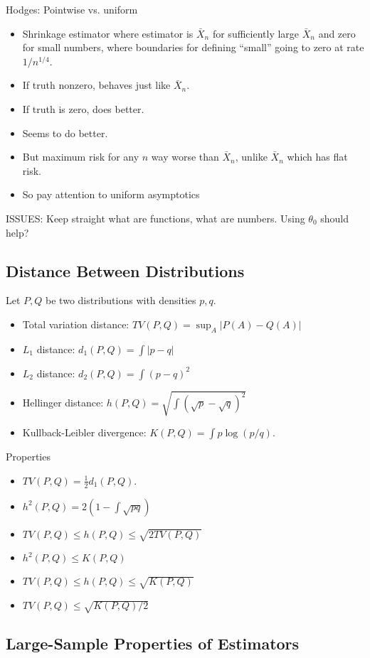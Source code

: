 \documentclass[12pt]{article}
\theoremstyle{plain}
\theoremstyle{definition}
\theoremstyle{remark}
\begin{document}
Hodges: Pointwise vs. uniform
\begin{itemize}
  \item Shrinkage estimator where estimator is $\bar{X}_n$ for
    sufficiently large $\bar{X}_n$ and zero for small numbers,
    where boundaries for defining ``small'' going to zero at rate
    $1/n^{1/4}$.
  \item If truth nonzero, behaves just like $\bar{X}_n$.
  \item If truth is zero, does better.
  \item Seems to do better.
  \item But maximum risk for any $n$ way worse than $\bar{X}_n$, unlike
    $\bar{X}_n$ which has flat risk.
  \item So pay attention to uniform asymptotics
\end{itemize}
ISSUES:
Keep straight what are functions, what are numbers.
Using $\theta_0$ should help?


\clearpage
\subsection{Distance Between Distributions}

Let $P,Q$ be two distributions with densities $p,q$.
\begin{itemize}
  \item Total variation distance:
    $TV(P,Q)=\sup_A|P(A)-Q(A)|$
  \item $L_1$ distance: $d_1(P,Q) = \int |p-q|$
  \item $L_2$ distance: $d_2(P,Q) = \int (p-q)^2$
  \item Hellinger distance: $h(P,Q) = \sqrt{\int (\sqrt{p}-\sqrt{q})^2}$
  \item Kullback-Leibler divergence: $K(P,Q)=\int p\log(p/q)$.
\end{itemize}
Properties
\begin{itemize}
  \item $TV(P,Q)=\frac{1}{2}d_1(P,Q)$.
  \item $h^2(P,Q)=2(1-\int \sqrt{pq})$
  \item $TV(P,Q)\leq h(P,Q)\leq \sqrt{2TV(P,Q)}$
  \item $h^2(P,Q)\leq K(P,Q)$
  \item $TV(P,Q)\leq h(P,Q)\leq \sqrt{K(P,Q)}$
  \item $TV(P,Q)\leq \sqrt{K(P,Q)/2}$
\end{itemize}


\subsection{Large-Sample Properties of Estimators}
\end{document}

